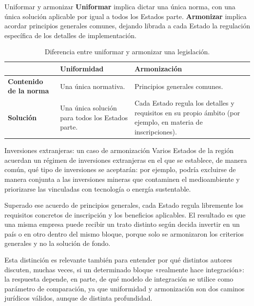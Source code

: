 \documentclass[12pt,oneside]{book}
\begin{document}
\begin{definition}{Uniformar y armonizar}
\textbf{Uniformar} implica dictar una única norma, con una única solución aplicable por igual a todos los Estados parte. \textbf{Armonizar} implica acordar principios generales comunes, dejando librada a cada Estado la regulación específica de los detalles de implementación.
\end{definition}

\begin{table}[H]
\centering
\renewcommand{\arraystretch}{1.3}
\begin{tabularx}{\textwidth}{
    >{\raggedright\arraybackslash}p{}
    >{\raggedright\arraybackslash}X
    >{\raggedright\arraybackslash}X
}
\toprule
 & \textbf{Uniformidad} & \textbf{Armonización} \\
\midrule
\textbf{Contenido de la norma} & Una única normativa. & Principios generales comunes. \\
\textbf{Solución} & Una única solución para todos los Estados parte. & Cada Estado regula los detalles y requisitos en su propio ámbito (por ejemplo, en materia de inscripciones). \\
\bottomrule
\end{tabularx}
\caption*{Diferencia entre uniformar y armonizar una legislación.}
\end{table}

\begin{example}{Inversiones extranjeras: un caso de armonización}
Varios Estados de la región acuerdan un régimen de inversiones extranjeras en el que se establece, de manera común, qué tipo de inversiones se aceptarán: por ejemplo, podría excluirse de manera conjunta a las inversiones mineras que contaminen el medioambiente y priorizarse las vinculadas con tecnología o energía sustentable.

Superado ese acuerdo de principios generales, cada Estado regula libremente los requisitos concretos de inscripción y los beneficios aplicables. El resultado es que una misma empresa puede recibir un trato distinto según decida invertir en un país o en otro dentro del mismo bloque, porque solo se armonizaron los criterios generales y no la solución de fondo.
\end{example}

Esta distinción es relevante también para entender por qué distintos autores discuten, muchas veces, si un determinado bloque «realmente hace integración»: la respuesta depende, en parte, de qué modelo de integración se utilice como parámetro de comparación, ya que uniformidad y armonización son dos caminos jurídicos válidos, aunque de distinta profundidad.
\end{document}
